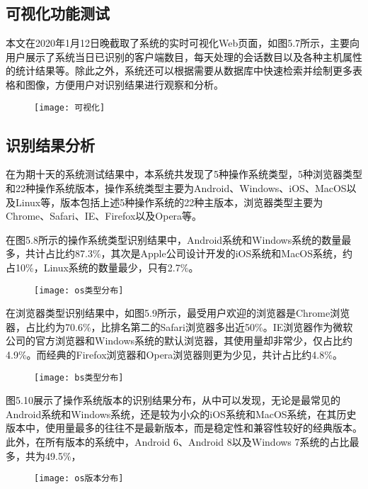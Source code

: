 \subsection{可视化功能测试}

本文在2020年1月12日晚截取了系统的实时可视化Web页面，如图5.7所示，主要向用户展示了系统当日已识别的客户端数目，每天处理的会话数目以及各种主机属性的统计结果等。除此之外，系统还可以根据需要从数据库中快速检索并绘制更多表格和图像，方便用户对识别结果进行观察和分析。

\begin{figure}[!htbp]
    \centering
    \texttt{[image: 可视化]}
\end{figure}

\subsection{识别结果分析}

在为期十天的系统测试结果中，本系统共发现了5种操作系统类型，5种浏览器类型和22种操作系统版本，操作系统类型主要为Android、Windows、iOS、MacOS以及Linux等，版本包括上述5种操作系统的22种主版本，浏览器类型主要为Chrome、Safari、IE、Firefox以及Opera等。

在图5.8所示的操作系统类型识别结果中，Android系统和Windows系统的数量最多，共计占比约87.3\%，其次是Apple公司设计开发的iOS系统和MacOS系统，约占10\%，Linux系统的数量最少，只有2.7\%。

\begin{figure}[!h]
    \centering
    \texttt{[image: os类型分布]}
\end{figure}

在浏览器类型识别结果中，如图5.9所示，最受用户欢迎的浏览器是Chrome浏览器，占比约为70.6\%，比排名第二的Safari浏览器多出近50\%。IE浏览器作为微软公司的官方浏览器和Windows系统的默认浏览器，其使用量却非常少，仅占比约4.9\%。而经典的Firefox浏览器和Opera浏览器则更为少见，共计占比约4.8\%。

\begin{figure}[!h]
    \centering
    \texttt{[image: bs类型分布]}
\end{figure}

图5.10展示了操作系统版本的识别结果分布，从中可以发现，无论是最常见的Android系统和Windows系统，还是较为小众的iOS系统和MacOS系统，在其历史版本中，使用量最多的往往不是最新版本，而是稳定性和兼容性较好的经典版本。此外，在所有版本的系统中，Android 6、Android 8以及Windows 7系统的占比最多，共为49.5\%，
\begin{figure}[!h]
    \centering
    \texttt{[image: os版本分布]}
\end{figure}

